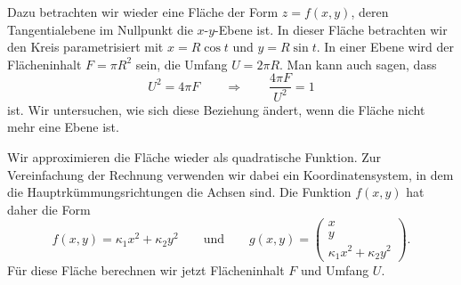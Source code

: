 Dazu betrachten wir wieder eine Fläche der Form $z=f(x,y)$, deren
Tangentialebene im Nullpunkt die $x$-$y$-Ebene ist.
In dieser Fläche betrachten wir den Kreis parametrisiert mit
$x=R\cos t$ und $y=R\sin t$.
In einer Ebene wird der Flächeninhalt $F=\pi R^2$ sein, die Umfang $U=2\pi R$.
Man kann auch sagen, dass
\[
U^2 = 4\pi F
\qquad\Rightarrow\qquad
\frac{4\pi F}{U^2}=1
\]
ist.
Wir untersuchen, wie sich diese Beziehung ändert, wenn die
Fläche nicht mehr eine Ebene ist.

Wir approximieren die Fläche wieder als quadratische Funktion.
Zur Vereinfachung der Rechnung verwenden wir dabei ein Koordinatensystem,
in dem die Hauptrkümmungsrichtungen die Achsen sind.
Die Funktion $f(x,y)$ hat daher die Form
\[
f(x,y)
=
\kappa_1 x^2 + \kappa_2 y^2
\qquad\text{und}\qquad
g(x,y)=\begin{pmatrix}x\\y\\\kappa_1x^2 + \kappa_2y^2\end{pmatrix}.
\]
Für diese Fläche berechnen wir jetzt Flächeninhalt $F$ und 
Umfang $U$.

